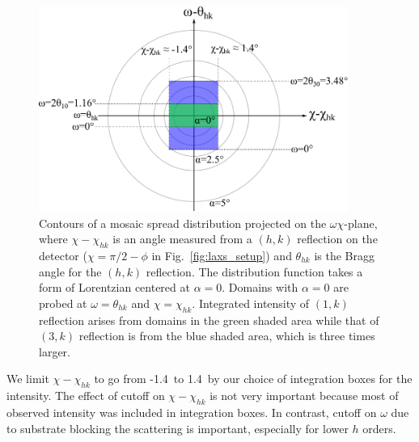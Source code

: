 \begin{figure}[htbp]
  \centering
  \includegraphics[width=0.9\textwidth]{figures/ripple/analysis/mosaic_contour}
  \caption{Contours of a mosaic spread distribution projected on the $\omega\chi$-plane,
  where $\chi-\chi_{hk}$ is an angle measured from a $(h,k)$ reflection on the detector
  ($\chi=\pi/2-\phi$ in Fig.~\ref{fig:laxs_setup}) and $\theta_{hk}$ is the
  Bragg angle for the $(h,k)$ reflection.
  The distribution function takes a form of Lorentzian centered at $\alpha=0$.
  Domains with $\alpha=0$ are probed at $\omega=\theta_{hk}$ and $\chi=\chi_{hk}$.
  Integrated intensity of $(1,k)$ reflection arises from domains in the green
  shaded area while that of $(3,k)$ reflection is from the
  blue shaded area, which is three times larger.}
  \label{fig:mosaic_contour} 
\end{figure}

We limit 
$\chi-\chi_{hk}$ to go from -1.4\textdegree\ to 1.4\textdegree\
by our choice of integration boxes for the intensity.  
The effect of cutoff on $\chi-\chi_{hk}$ is not very important
because most of observed intensity was included in integration boxes.
In contrast, cutoff on $\omega$ due to substrate blocking the scattering
is important, especially for lower $h$ orders.
 
